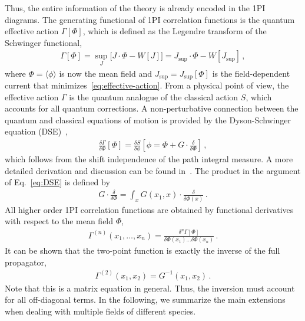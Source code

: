 Thus, the entire information of the theory is already encoded in the 1PI diagrams. The generating functional of 1PI correlation functions is the quantum effective action $\Gamma[\Phi]$, which is defined as the Legendre transform of the Schwinger functional,
%
\begin{align}
	\label{eq:effective-action}
	\Gamma[\Phi] = \sup_J\big[J\cdot\Phi - W[J]\big] = J_{\sup}\cdot\Phi - W[J_{\sup}] \,,
\end{align}
%
where $\Phi=\langle\phi\rangle$ is now the mean field and $J_{\sup} = J_{\sup}[\Phi]$ is the field-dependent current that minimizes~\eqref{eq:effective-action}. From a physical point of view, the effective action $\Gamma$ is the quantum analogue of the classical action $S$, which accounts for all quantum corrections. A non-perturbative connection between the quantum and classical equations of motion is provided by the Dyson-Schwinger equation (DSE)~\cite{Dyson1949,Schwinger1951},
%
\begin{align}
	\label{eq:DSE}
	\frac{\delta\Gamma}{\delta\Phi}\left[\Phi\right] = \frac{\delta S}{\delta\phi}\left[\phi=\Phi+G\cdot\frac{\delta}{\delta\Phi}\right] \,,
\end{align}
%
which follows from the shift independence of the path integral measure. A more detailed derivation and discussion can be found in~\cite{Pawlowski2021}. The product in the argument of Eq.~\eqref{eq:DSE} is defined by
%
\begin{align}
	\label{eq:propgator-derivative}
	G\cdot\frac{\delta}{\delta\Phi} = \int_x G(x_1,x)\cdot\frac{\delta}{\delta\Phi(x)} \,.
\end{align}
%
All higher order 1PI correlation functions are obtained by functional derivatives with respect to the mean field $\Phi$,
%
\begin{align}
	\label{eq:1PI-correlation-functions}
	\Gamma^{(n)}(x_1,\dots,x_n)=\frac{\delta^n\Gamma[\Phi]}{\delta\Phi(x_1)\dots\delta\Phi(x_n)} \,.
\end{align}
%
It can be shown that the two-point function is exactly the inverse of the full propagator,
%
\begin{align}
	\label{eq:propagator-gamma}
	\Gamma^{(2)}(x_1,x_2) = G^{-1}(x_1,x_2) \,.
\end{align}
%
Note that this is a matrix equation in general. Thus, the inversion must account for all off-diagonal terms. In the following, we summarize the main extensions when dealing with multiple fields of different species.

